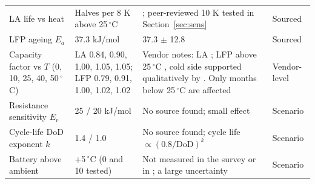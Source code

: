 \documentclass[11pt,a4paper]{article}
\begin{document}
\begin{table}[t]
\begin{tabular}{p{2.5cm}p{3.3cm}p{6.8cm}p{1.8cm}}
LA life vs heat & Halves per 8 K above 25\,$^\circ$C & \cite{bu806a}; peer-reviewed 10 K \cite{tsujikawa2009} tested in Section~\ref{sec:sens} & Sourced \\
LFP ageing $E_a$ & 37.3 kJ/mol & 37.3 $\pm$ 12.8 \cite{yagci2026} & Sourced \\
Capacity factor vs $T$ (0, 10, 25, 40, 50\,$^\circ$C) & LA 0.84, 0.90, 1.00, 1.05, 1.05; LFP 0.79, 0.91, 1.00, 1.02, 1.02 & Vendor notes: LA \cite{discoverbattery}; LFP above 25\,$^\circ$C \cite{bonnen2026}, cold side supported qualitatively by \cite{bauknecht2023}. Only months below 25\,$^\circ$C are affected & Vendor-level \\
Resistance sensitivity $E_r$ & 25 / 20 kJ/mol & No source found; small effect & Scenario \\
Cycle-life DoD exponent $k$ & 1.4 / 1.0 & No source found; cycle life $\propto (0.8/\mathrm{DoD})^k$ & Scenario \\
Battery above ambient & +5\,$^\circ$C (0 and 10 tested) & Not measured in the survey or in \cite{chowdhury2026}; a large uncertainty & Scenario \\
\hline
\end{tabular}
\end{table}
\end{document}
